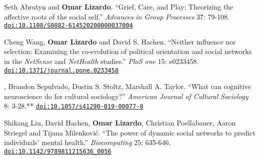 \ind Seth Abrutyn and {\bf Omar Lizardo}. ``Grief, Care, and Play: Theorizing the affective roots of the social self.'' {\em Advances in Group Processes} 37: 79-108.  \href{https://doi.org/10.1108/S0882-614520200000037004}{\nolinkurl{doi:10.1108/S0882-614520200000037004}}

\ind Cheng Wang, {\bf Omar Lizardo} and David S. Hachen. ``Neither influence nor selection: Examining the co-evolution of political orientation and social networks in the {\em NetSense} and {\em NetHealth} studies.'' {\em PloS one} 15: e0233458. \href{https://doi.org/10.1371/journal.pone.0233458}{\nolinkurl{doi:10.1371/journal.pone.0233458}}

, Brandon Sepulvado, Dustin S. Stoltz, Marshall A. Taylor. ``What can cognitive neuroscience do for cultural sociology?'' {\em American Journal of Cultural Sociology} 8: 3-28.\textcolor{uclablue}{**} \newline\href{https://doi.org/10.1057/s41290-019-00077-8}{\nolinkurl{doi:10.1057/s41290-019-00077-8}}

\ind Shikang Liu, David Hachen, {\bf Omar Lizardo}, Christian Poellabauer, Aaron Striegel and Tijana Milenkovi\'{c}. ``The power of dynamic social networks to predict individuals' mental health.'' {\em Biocomputing} 25: 635-646. \href{https://doi.org/10.1142/9789811215636_0056}{\nolinkurl{doi:10.1142/9789811215636_0056}}
\medskip